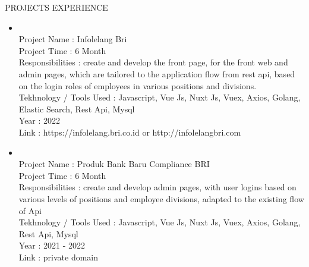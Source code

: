 

\begin{tcolorbox}
    [
    width=\textwidth, 
    colframe=WhiteSmoke,
    colback=LinkedInBlue,
    arc=1mm,
    ]
    \color{WhiteSmoke}
    \centerline{\Large PROJECTS EXPERIENCE}
\end{tcolorbox}


\begin{itemize}


    \item {\color{LinkedInBlue} }\\ 
    \mybullet Project Name : Infolelang Bri \\
    \mybullet Project Time : 6 Month \\
    \mybullet Responsibilities : create and develop the front page, for the front web and admin pages, which are tailored to the application flow from rest api, based on the login roles of employees in various positions and divisions. \\
    \mybullet Tekhnology / Tools Used : Javascript, Vue Js, Nuxt Js, Vuex, Axios, Golang, Elastic Search, Rest Api, Mysql \\
    \mybullet Year : 2022 \\
    \mybullet Link : https://infolelang.bri.co.id or http://infolelangbri.com \\

    \item {\color{LinkedInBlue} }\\ 
    \mybullet Project Name : Produk Bank Baru Compliance BRI \\
    \mybullet Project Time : 6 Month \\
    \mybullet Responsibilities : create and develop admin pages, with user logins based on various levels of positions and employee divisions, adapted to the existing flow of Api \\
    \mybullet Tekhnology / Tools Used : Javascript, Vue Js, Nuxt Js, Vuex, Axios, Golang, Rest Api, Mysql \\
    \mybullet Year : 2021 - 2022 \\
    \mybullet Link : private domain \\


\end{itemize}
